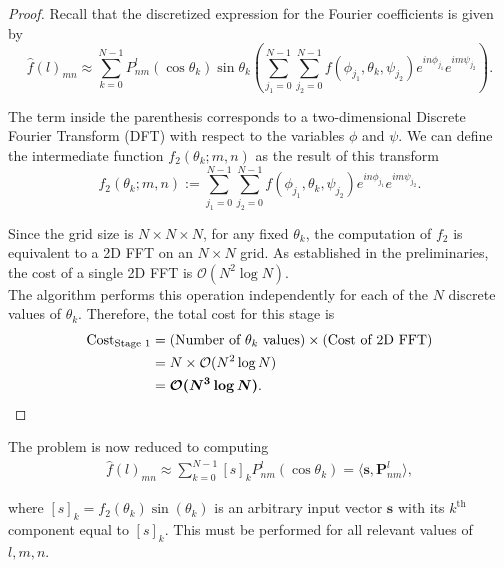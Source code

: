 \documentclass[11pt]{article}
\theoremstyle{definition}
\theoremstyle{remark}
\numberwithin{equation}{section}
\begin{document}
\begin{proof}
Recall that the discretized expression for the Fourier coefficients is given by
\begin{equation*}
    \hat{f}(l)_{mn} \approx \sum_{k=0}^{N-1} P^l_{nm}(\cos \theta_k) \sin \theta_k \left( \sum_{j_1=0}^{N-1} \sum_{j_2=0}^{N-1} f(\phi_{j_1}, \theta_k, \psi_{j_2}) e^{in\phi_{j_1}} e^{im\psi_{j_2}} \right).
\end{equation*}

The term inside the parenthesis corresponds to a two-dimensional Discrete Fourier Transform (DFT) with respect to the variables $\phi$ and $\psi$. We can define the intermediate function $f_2(\theta_k; m, n)$ as the result of this transform
\begin{equation}
    f_2(\theta_k; m, n) := \sum_{j_1=0}^{N-1} \sum_{j_2=0}^{N-1} f(\phi_{j_1}, \theta_k, \psi_{j_2}) e^{in\phi_{j_1}} e^{im\psi_{j_2}}.
\end{equation}

Since the grid size is $N \times N \times N$, for any fixed $\theta_k$, the computation of $f_2$ is equivalent to a 2D FFT on an $N \times N$ grid. As established in the preliminaries, the cost of a single 2D FFT is $\mathcal{O}(N^2 \log N)$.\\%

The algorithm performs this operation independently for each of the $N$ discrete values of $\theta_k$. Therefore, the total cost for this stage is
\begin{align*}
    \text{Cost}_{\text{Stage 1}} &= (\text{Number of } \theta_k \text{ values}) \times (\text{Cost of 2D FFT}) \\
    &= N \times \mathcal{O}(N^2 \log N) \\
    &= \boldsymbol{\mathcal{O}(N^3 \log N)}. \qedhere
\end{align*}
\end{proof}

The problem is now reduced to computing
\begin{align}\label{EQ_OP_1}
    \hat{f}(l)_{mn}\approx\sum_{k=0}^{N-1}[s]_k P^l_{nm}(\cos \theta_k) = \langle \mathbf{s}, \mathbf{P}^l_{nm} \rangle,
\end{align}

where $[s]_k = f_2(\theta_k) \sin(\theta_k)$ is an arbitrary input vector $\mathbf{s}$ with its $k^{\text{th}}$ component equal to $[s]_k$. This must be performed for all relevant values of $l, m, n$.\\%
\end{document}
